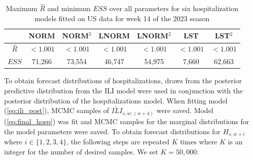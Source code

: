 \begin{table}
\caption{Maximum $\hat{R}$ and minimum $ESS$ over all parameters for six 
hospitalization models fitted on US data for week 14 of the 2023 season}
\label{tab:hsop_diagnostics}
\begin{center}
    \begin{tabular}{c|cccccc}
     & NORM & NORM$^2$ & LNORM & LNORM$^2$ &  LST &  LST$^2$ \\
     \hline
     $\hat{R}$ & $< 1.001$ & $< 1.001$ & $< 1.001$ & $< 1.001$ & $< 1.001$ & 
     $< 1.001$\\
     $ESS$  & 71,266 & 73,554 & 46,747 & 54,975 & 7,660 & 62,663 \\
    \end{tabular}
    \end{center}
\end{table}






To obtain forecast distributions of hospitalizations, draws from the posterior 
predictive distribution from the ILI model were used in conjunction with the 
posterior distribution of the hospitalizations model. When fitting model 
(\ref{eq:ili_post}), MCMC samples of $\widetilde{ILI}_{s,w:(w + 4)}$ were 
saved. Model (\ref{eq:final_hosp}) was fit and MCMC samples for the marginal 
distributions for the model parameters were saved. To obtain forecast 
distributions for $H_{s,w + i}$ where $i \in \{1,2,3,4\}$, the following 
steps are repeated $K$ times where $K$ is an integer for the number of desired 
samples. We set $K = 50,000$.

